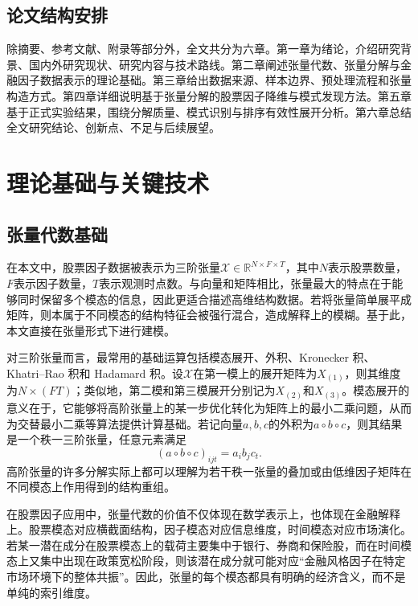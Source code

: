 \section{论文结构安排}

除摘要、参考文献、附录等部分外，全文共分为六章。第一章为绪论，介绍研究背景、国内外研究现状、研究内容与技术路线。第二章阐述张量代数、张量分解与金融因子数据表示的理论基础。第三章给出数据来源、样本边界、预处理流程和张量构造方式。第四章详细说明基于张量分解的股票因子降维与模式发现方法。第五章基于正式实验结果，围绕分解质量、模式识别与排序有效性展开分析。第六章总结全文研究结论、创新点、不足与后续展望。

\chapter{理论基础与关键技术}

\section{张量代数基础}

在本文中，股票因子数据被表示为三阶张量$\mathcal{X}\in\mathbb{R}^{N\times F\times T}$，其中$N$表示股票数量，$F$表示因子数量，$T$表示观测时点数。与向量和矩阵相比，张量最大的特点在于能够同时保留多个模态的信息，因此更适合描述高维结构数据。若将张量简单展平成矩阵，则本属于不同模态的结构特征会被强行混合，造成解释上的模糊。基于此，本文直接在张量形式下进行建模。

对三阶张量而言，最常用的基础运算包括模态展开、外积、Kronecker 积、Khatri--Rao 积和 Hadamard 积。设$\mathcal{X}$在第一模上的展开矩阵为$X_{(1)}$，则其维度为$N\times(FT)$；类似地，第二模和第三模展开分别记为$X_{(2)}$和$X_{(3)}$。模态展开的意义在于，它能够将高阶张量上的某一步优化转化为矩阵上的最小二乘问题，从而为交替最小二乘等算法提供计算基础。若记向量$a,b,c$的外积为$a\circ b\circ c$，则其结果是一个秩一三阶张量，任意元素满足
\begin{equation}
\left(a\circ b\circ c\right)_{ijt}=a_i b_j c_t.
\end{equation}
高阶张量的许多分解实际上都可以理解为若干秩一张量的叠加或由低维因子矩阵在不同模态上作用得到的结构重组。

在股票因子应用中，张量代数的价值不仅体现在数学表示上，也体现在金融解释上。股票模态对应横截面结构，因子模态对应信息维度，时间模态对应市场演化。若某一潜在成分在股票模态上的载荷主要集中于银行、券商和保险股，而在时间模态上又集中出现在政策宽松阶段，则该潜在成分就可能对应“金融风格因子在特定市场环境下的整体共振”。因此，张量的每个模态都具有明确的经济含义，而不是单纯的索引维度。


